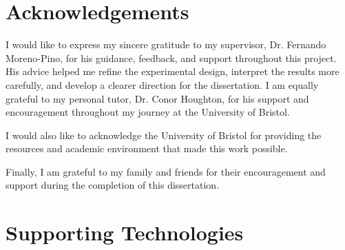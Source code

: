\documentclass[
    author={Aanchala Ravindra Bhongade},
    supervisor={Dr. Fernando Moreno-Pino},
    degree={MSc},
    title={Length Generalisation in Transformer-Based Sequence Models: Failure Taxonomy and Mitigation Strategies},
    subtitle={},
    type={},
    year={2026}
]{dissertation}
\begin{document}
\maketitle
\frontmatter
\makedecl


\chapter*{Acknowledgements}

\noindent
I would like to express my sincere gratitude to my supervisor, Dr. Fernando Moreno-Pino,  for his guidance, feedback, and support throughout this project. His advice helped me refine the experimental design, interpret the results more carefully, and develop a clearer direction for the dissertation. I am equally grateful to my personal tutor, Dr. Conor Houghton, for his support and encouragement throughout my journey at the University of Bristol.

I would also like to acknowledge the University of Bristol for providing the resources and academic environment that made this work possible.

Finally, I am grateful to my family and friends for their encouragement and support during the completion of this dissertation.





\tableofcontents
\listoffigures
\listoftables





\chapter*{Supporting Technologies}
\end{document}
